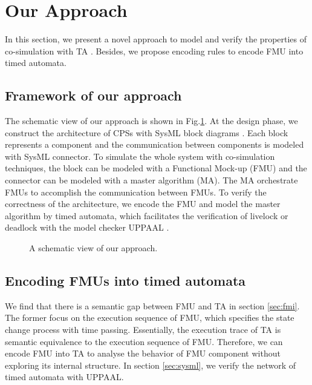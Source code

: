 \section{Our Approach}
In this section, we present a novel approach to model and verify the properties of co-simulation with TA \cite{AlurD94}. Besides, we propose encoding rules to encode FMU into timed automata.
\label{sec:encoding}
\subsection{Framework of our approach}
The schematic view of our approach is shown in Fig.\ref{paper-arc}. At the design phase, we construct the architecture of CPSs with SysML block diagrams \cite{RahimHI17}. Each block represents a component and the communication between components is modeled with SysML connector. To simulate the whole system with co-simulation techniques, the block can be modeled with a Functional Mock-up (FMU) and the connector can be modeled with a master algorithm (MA). The MA orchestrate FMUs to accomplish the communication between FMUs. To verify the correctness of the architecture, we encode the FMU and model the master algorithm by timed automata, which facilitates the verification of livelock or deadlock with the model checker UPPAAL \cite{BehrmannDLHPYH06}.
\begin{figure}[htbp]
	\caption{A schematic view of our approach.}
	\label{paper-arc}
\end{figure}

\subsection{Encoding FMUs into timed automata}
We find that there is a semantic gap between FMU and TA in section \ref{sec:fmi}. The former focus on the execution sequence of FMU, which specifies the state change process with time passing. Essentially, the execution trace of TA is semantic equivalence to the execution sequence of FMU. Therefore, we can encode FMU into TA to analyse the behavior of FMU component without exploring its internal structure. In section \ref{sec:sysml}, we verify the network of timed automata with UPPAAL.

